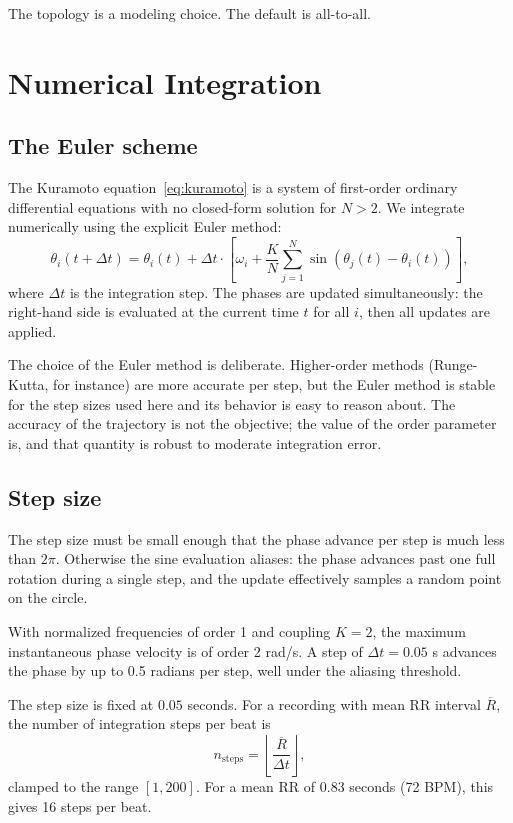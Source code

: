 \documentclass[11pt]{article}
\begin{document}
The topology is a modeling choice. The default is all-to-all.

\section{Numerical Integration}\label{sec:integration}

\subsection{The Euler scheme}

The Kuramoto equation~\eqref{eq:kuramoto} is a system of first-order
ordinary differential equations with no closed-form solution for
$N > 2$. We integrate numerically using the explicit Euler method:
\begin{equation}
\theta_i(t + \Delta t) = \theta_i(t) + \Delta t \cdot \left[
\omega_i + \frac{K}{N} \sum_{j=1}^{N} \sin(\theta_j(t) - \theta_i(t))
\right],
\label{eq:euler}
\end{equation}
where $\Delta t$ is the integration step. The phases are updated
simultaneously: the right-hand side is evaluated at the current time
$t$ for all $i$, then all updates are applied.

The choice of the Euler method is deliberate. Higher-order methods
(Runge-Kutta, for instance) are more accurate per step, but the Euler
method is stable for the step sizes used here and its behavior is easy
to reason about. The accuracy of the trajectory is not the objective;
the value of the order parameter is, and that quantity is robust to
moderate integration error.

\subsection{Step size}

The step size must be small enough that the phase advance per step is
much less than $2\pi$. Otherwise the sine evaluation aliases: the phase
advances past one full rotation during a single step, and the update
effectively samples a random point on the circle.

With normalized frequencies of order 1 and coupling $K = 2$, the
maximum instantaneous phase velocity is of order 2 rad/s. A step of
$\Delta t = 0.05$ s advances the phase by up to 0.5 radians per step,
well under the aliasing threshold.

The step size is fixed at $0.05$ seconds. For a recording with mean RR
interval $\overline{R}$, the number of integration steps per beat is
\begin{equation}
n_{\text{steps}} = \left\lfloor \frac{\overline{R}}{\Delta t} \right\rfloor,
\label{eq:steps}
\end{equation}
clamped to the range $[1, 200]$. For a mean RR of $0.83$ seconds (72
BPM), this gives 16 steps per beat.
\end{document}
